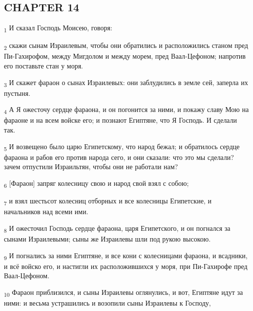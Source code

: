 \subsection{CHAPTER 14}
\begin{tcolorbox}
\textsubscript{1} И сказал Господь Моисею, говоря:
\end{tcolorbox}
\begin{tcolorbox}
\textsubscript{2} скажи сынам Израилевым, чтобы они обратились и расположились станом пред Пи-Гахирофом, между Мигдолом и между морем, пред Ваал-Цефоном; напротив его поставьте стан у моря.
\end{tcolorbox}
\begin{tcolorbox}
\textsubscript{3} И скажет фараон о сынах Израилевых: они заблудились в земле сей, заперла их пустыня.
\end{tcolorbox}
\begin{tcolorbox}
\textsubscript{4} А Я ожесточу сердце фараона, и он погонится за ними, и покажу славу Мою на фараоне и на всем войске его; и познают Египтяне, что Я Господь. И сделали так.
\end{tcolorbox}
\begin{tcolorbox}
\textsubscript{5} И возвещено было царю Египетскому, что народ бежал; и обратилось сердце фараона и рабов его против народа сего, и они сказали: что это мы сделали? зачем отпустили Израильтян, чтобы они не работали нам?
\end{tcolorbox}
\begin{tcolorbox}
\textsubscript{6} [Фараон] запряг колесницу свою и народ свой взял с собою;
\end{tcolorbox}
\begin{tcolorbox}
\textsubscript{7} и взял шестьсот колесниц отборных и все колесницы Египетские, и начальников над всеми ими.
\end{tcolorbox}
\begin{tcolorbox}
\textsubscript{8} И ожесточил Господь сердце фараона, царя Египетского, и он погнался за сынами Израилевыми; сыны же Израилевы шли под рукою высокою.
\end{tcolorbox}
\begin{tcolorbox}
\textsubscript{9} И погнались за ними Египтяне, и все кони с колесницами фараона, и всадники, и всё войско его, и настигли их расположившихся у моря, при Пи-Гахирофе пред Ваал-Цефоном.
\end{tcolorbox}
\begin{tcolorbox}
\textsubscript{10} Фараон приблизился, и сыны Израилевы оглянулись, и вот, Египтяне идут за ними: и весьма устрашились и возопили сыны Израилевы к Господу,
\end{tcolorbox}
